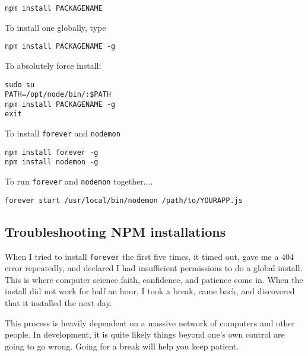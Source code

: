 \begin{lstlisting}
npm install PACKAGENAME
\end{lstlisting}

To install one globally, type
\begin{lstlisting}
npm install PACKAGENAME -g
\end{lstlisting}


To absolutely force install:
\begin{lstlisting}
sudo su
PATH=/opt/node/bin/:$PATH
npm install PACKAGENAME -g
exit
\end{lstlisting}

To install \texttt{forever} and \texttt{nodemon}
\begin{lstlisting}
npm install forever -g
npm install nodemon -g
\end{lstlisting}

To run \texttt{forever} and \texttt{nodemon} together....
\begin{lstlisting}
forever start /usr/local/bin/nodemon /path/to/YOURAPP.js
\end{lstlisting}

\subsection{Troubleshooting NPM installations}
When I tried to install \texttt{forever} the first five times, it timed out, gave me a 404 error repeatedly, and declared I had insufficient permissions to do a global install. This is where computer science faith, confidence, and patience come in. When the install did not work for half an hour, I took a break, came back, and discovered that it installed the next day.

This process is heavily dependent on a massive network of computers and other people. In development, it is quite likely things beyond one's own control are going to go wrong. Going for a break will help you keep patient.

